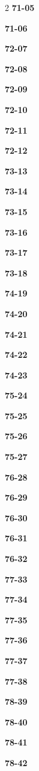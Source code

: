 \documentclass[10pt,a4paper]{article}
\begin{document}
\begin{multicols}{2}
\noindent\textbf{71-05}\ \par
\noindent\textbf{71-06}\ \par
\noindent\textbf{72-07}\ \par
\noindent\textbf{72-08}\ \par
\noindent\textbf{72-09}\ \par
\noindent\textbf{72-10}\ \par
\noindent\textbf{72-11}\ \par
\noindent\textbf{72-12}\ \par
\noindent\textbf{73-13}\ \par
\noindent\textbf{73-14}\ \par
\noindent\textbf{73-15}\ \par
\noindent\textbf{73-16}\ \par
\noindent\textbf{73-17}\ \par
\noindent\textbf{73-18}\ \par
\noindent\textbf{74-19}\ \par
\noindent\textbf{74-20}\ \par
\noindent\textbf{74-21}\ \par
\noindent\textbf{74-22}\ \par
\noindent\textbf{74-23}\ \par
\noindent\textbf{75-24}\ \par
\noindent\textbf{75-25}\ \par
\noindent\textbf{75-26}\ \par
\noindent\textbf{75-27}\ \par
\noindent\textbf{76-28}\ \par
\noindent\textbf{76-29}\ \par
\noindent\textbf{76-30}\ \par
\noindent\textbf{76-31}\ \par
\noindent\textbf{76-32}\ \par
\noindent\textbf{77-33}\ \par
\noindent\textbf{77-34}\ \par
\noindent\textbf{77-35}\ \par
\noindent\textbf{77-36}\ \par
\noindent\textbf{77-37}\ \par
\noindent\textbf{77-38}\ \par
\noindent\textbf{78-39}\ \par
\noindent\textbf{78-40}\ \par
\noindent\textbf{78-41}\ \par
\noindent\textbf{78-42}\ \par

\end{multicols}
\end{document}
